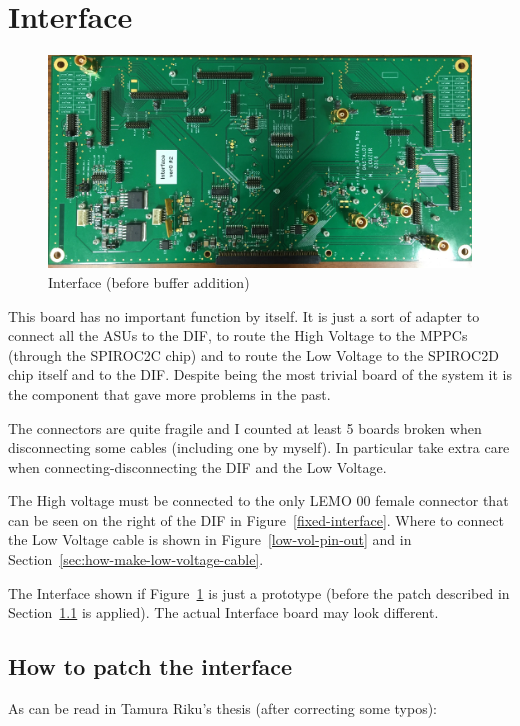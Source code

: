 \section{Interface}
\begin{figure}[H]
  \centering \includegraphics[width=0.8\linewidth, frame]{Interface}
  \caption{Interface (before buffer addition)}\label{fig:Interface}
\end{figure}
This board has no important function by itself. It is just a sort of adapter to
connect all the ASUs to the DIF, to route the High Voltage to the MPPCs (through
the SPIROC2C chip) and to route the Low Voltage to the SPIROC2D chip itself and
to the DIF. Despite being the most trivial board of the system it is the
component that gave more problems in the past.

The connectors are quite fragile and I counted at least 5 boards broken when
disconnecting some cables (including one by myself). In particular take extra
care when connecting-disconnecting the DIF and the Low Voltage.

The High voltage must be connected to the only LEMO 00 female connector that can
be seen on the right of the DIF in Figure~\ref{fixed-interface}. Where to
connect the Low Voltage cable is shown in Figure~\ref{low-vol-pin-out} and in
Section~\ref{sec:how-make-low-voltage-cable}.

The Interface shown if Figure~\ref{fig:Interface} is just a prototype (before
the patch described in Section~\ref{sec:how-patch-interface} is applied). The
actual Interface board may look different.

\subsection{How to patch the interface}\label{sec:how-patch-interface}
As can be read in Tamura Riku's thesis (after correcting some typos):

